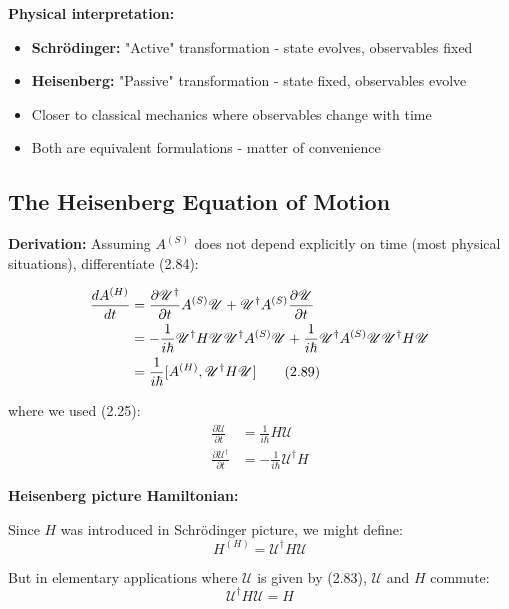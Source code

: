 \documentclass[11pt,a4paper]{article}
\begin{document}
\textbf{Physical interpretation:}
\begin{itemize}
\item \textbf{Schrödinger:} "Active" transformation - state evolves, observables fixed
\item \textbf{Heisenberg:} "Passive" transformation - state fixed, observables evolve
\item Closer to classical mechanics where observables change with time
\item Both are equivalent formulations - matter of convenience
\end{itemize}

\subsection{The Heisenberg Equation of Motion}

\textbf{Derivation:} Assuming $A^{(S)}$ does not depend explicitly on time (most physical situations), differentiate (2.84):

\begin{align}
\frac{dA^{(H)}}{dt} &= \frac{\partial\mathscr{U}^\dagger}{\partial t}A^{(S)}\mathscr{U} + \mathscr{U}^\dagger A^{(S)}\frac{\partial\mathscr{U}}{\partial t} \notag \\
&= -\frac{1}{i\hbar}\mathscr{U}^\dagger H\mathscr{U}\mathscr{U}^\dagger A^{(S)}\mathscr{U} + \frac{1}{i\hbar}\mathscr{U}^\dagger A^{(S)}\mathscr{U}\mathscr{U}^\dagger H\mathscr{U} \notag \\
&= \frac{1}{i\hbar}[A^{(H)}, \mathscr{U}^\dagger H\mathscr{U}]
\tag{2.89}
\end{align}

where we used (2.25):
\begin{align}
\frac{\partial\mathscr{U}}{\partial t} &= \frac{1}{i\hbar}H\mathscr{U} \tag{2.90a} \\
\frac{\partial\mathscr{U}^\dagger}{\partial t} &= -\frac{1}{i\hbar}\mathscr{U}^\dagger H \tag{2.90b}
\end{align}

\textbf{Heisenberg picture Hamiltonian:}

Since $H$ was introduced in Schrödinger picture, we might define:
\begin{equation}
H^{(H)} = \mathscr{U}^\dagger H\mathscr{U}
\tag{2.91}
\end{equation}

But in elementary applications where $\mathscr{U}$ is given by (2.83), $\mathscr{U}$ and $H$ commute:
\begin{equation}
\mathscr{U}^\dagger H\mathscr{U} = H
\tag{2.92}
\end{equation}
\end{document}
